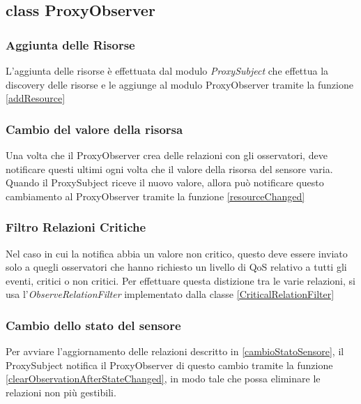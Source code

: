 		\subsection {class ProxyObserver}
			\subsubsection{Aggiunta delle Risorse}
				 L'aggiunta delle risorse è effettuata dal modulo \textit{ProxySubject} che effettua la discovery delle risorse e le aggiunge al modulo ProxyObserver tramite la funzione \ref{addResource}
				

			\subsubsection{Cambio del valore della risorsa}
				Una volta che il ProxyObserver crea delle relazioni con gli osservatori, deve notificare questi ultimi ogni volta che il valore della risorsa del sensore varia. Quando il ProxySubject riceve il nuovo valore, allora può notificare questo cambiamento al ProxyObserver tramite la funzione \ref{resourceChanged}
				

			\subsubsection{Filtro Relazioni Critiche}
				Nel caso in cui la notifica abbia un valore non critico, questo deve essere inviato solo a quegli osservatori che hanno richiesto un livello di QoS relativo a tutti gli eventi, critici o non critici. Per effettuare questa distizione tra le varie relazioni, si usa l'\textit{ObserveRelationFilter} implementato dalla classe \ref{CriticalRelationFilter}
				

			\subsubsection{Cambio dello stato del sensore}
				Per avviare l'aggiornamento delle relazioni descritto in \ref{cambioStatoSensore}, il ProxySubject notifica il ProxyObserver di questo cambio tramite la funzione \ref{clearObservationAfterStateChanged}, in modo tale che possa eliminare le relazioni non più gestibili.
				

